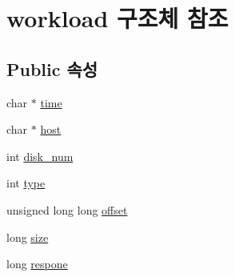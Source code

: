 \hypertarget{structworkload}{\section{workload 구조체 참조}
\label{structworkload}
}
\subsection*{Public 속성}
\begin{DoxyCompactItemize}
\item 
char $\ast$ \hyperlink{structworkload_a4401c89ba5cdd383f04301470e163cfd}{time}
\item 
char $\ast$ \hyperlink{structworkload_a3d757b51dfb82980f5a979a97bf0dfa1}{host}
\item 
int \hyperlink{structworkload_ac5fbfd8a1e652dc2b6e742ce685eb1fa}{disk\+\_\+num}
\item 
int \hyperlink{structworkload_aa2845ad1d10cf7ef276771aa7c038c40}{type}
\item 
unsigned long long \hyperlink{structworkload_abd28363163e81923118bfcef6776b746}{offset}
\item 
long \hyperlink{structworkload_aacbafed05a09d7d81c17345909a9dc5d}{size}
\item 
long \hyperlink{structworkload_a8de001cbb458db8f4502435a2a6c2030}{respone}
\end{DoxyCompactItemize}


